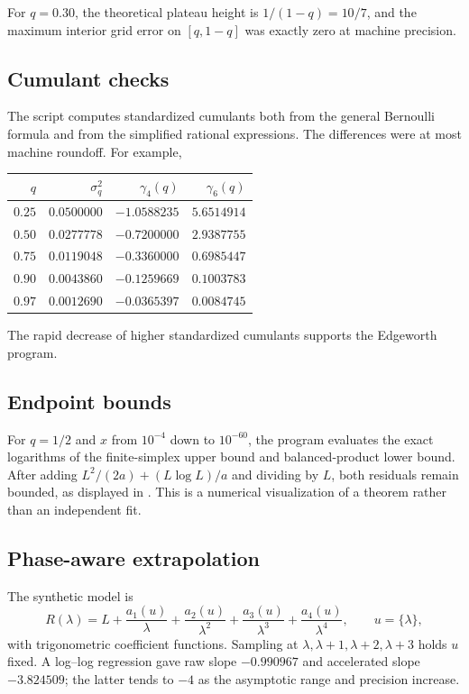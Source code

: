 \documentclass[11pt]{article}
\numberwithin{equation}{section}
\theoremstyle{definition}
\theoremstyle{remark}
\begin{document}
For $q=0.30$, the theoretical plateau height is $1/(1-q)=10/7$, and the maximum interior
grid error on $[q,1-q]$ was exactly zero at machine precision.

\subsection{Cumulant checks}

The script computes standardized cumulants both from the general Bernoulli formula and from
the simplified rational expressions.  The differences were at most machine roundoff.  For
example,
\begin{center}
\begin{tabular}{@{}rrrr@{}}
\toprule
$q$ & $\sigma_q^2$ & $\gamma_4(q)$ & $\gamma_6(q)$\\
\midrule
$0.25$ & $0.0500000$ & $-1.0588235$ & $5.6514914$\\
$0.50$ & $0.0277778$ & $-0.7200000$ & $2.9387755$\\
$0.75$ & $0.0119048$ & $-0.3360000$ & $0.6985447$\\
$0.90$ & $0.0043860$ & $-0.1259669$ & $0.1003783$\\
$0.97$ & $0.0012690$ & $-0.0365397$ & $0.0084745$\\
\bottomrule
\end{tabular}
\end{center}
The rapid decrease of higher standardized cumulants supports the Edgeworth program.

\subsection{Endpoint bounds}

For $q=1/2$ and $x$ from $10^{-4}$ down to $10^{-60}$, the program evaluates the exact
logarithms of the finite-simplex upper bound and balanced-product lower bound.  After adding
$L^2/(2a)+(L\log L)/a$ and dividing by $L$, both residuals remain bounded, as displayed in
.  This is a numerical visualization of a theorem rather than an
independent fit.

\subsection{Phase-aware extrapolation}

The synthetic model is
\[
 R(\lambda)=L+\frac{a_1(u)}{\lambda}
              +\frac{a_2(u)}{\lambda^2}
              +\frac{a_3(u)}{\lambda^3}
              +\frac{a_4(u)}{\lambda^4},
 \qquad u=\{\lambda\},
\]
with trigonometric coefficient functions.  Sampling at $\lambda,\lambda+1,\lambda+2,
\lambda+3$ holds $u$ fixed.  A log--log regression gave raw slope $-0.990967$ and accelerated
slope $-3.824509$; the latter tends to $-4$ as the asymptotic range and precision increase.
\end{document}
